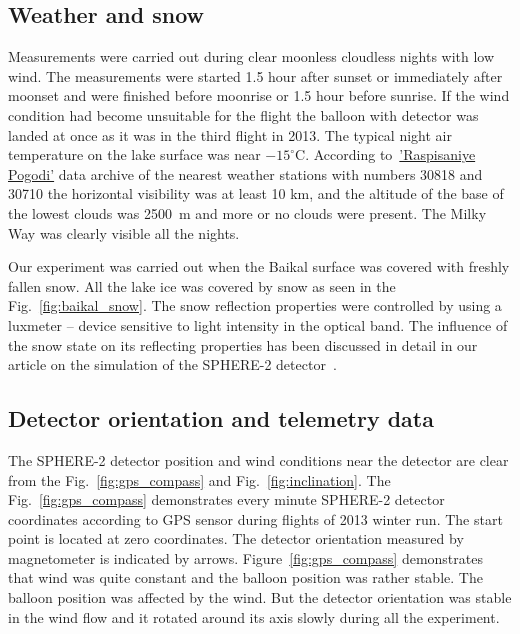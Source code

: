 \documentclass[final,5p,times,twocolumn]{elsarticle}
\begin{document}
\subsection{Weather and snow}

Measurements were carried out during clear moonless cloudless nights with low wind. The measurements were started 1.5 hour after sunset or immediately after moonset and were finished before moonrise or 1.5 hour before sunrise. If the wind condition had become unsuitable for the flight the balloon with detector was landed at once as it was in the third flight in 2013. The typical night air temperature on the lake surface was near $-15^\circ$C. According to~\href{https://rp5.ru/}{'Raspisaniye Pogodi'} data archive of the nearest weather stations with numbers 30818 and 30710 the horizontal visibility was at least 10 km, and the altitude of the base of the lowest clouds was 2500~m and more or no clouds were present. The Milky Way was clearly visible all the nights.

Our experiment was carried out when the Baikal surface was covered with freshly fallen snow. All the lake ice was covered by snow as seen in the Fig.~\ref{fig:baikal_snow}.  The snow reflection properties were controlled by using a luxmeter -- device sensitive to light intensity in the optical band. The influence of the snow state on its reflecting properties has been discussed in detail in our article on the simulation of the SPHERE-2 detector~\cite{Ant19}. 


\subsection{Detector orientation and telemetry data\label{sect:telemetrydata}}

The \mbox{SPHERE-2} detector position and wind conditions near the detector are clear from the Fig.~\ref{fig:gps_compass} and Fig.~\ref{fig:inclination}. The Fig.~\ref{fig:gps_compass} demonstrates every minute \mbox{SPHERE-2} detector coordinates according to GPS sensor during flights of 2013 winter run. The start point is located at zero coordinates. The detector orientation measured by magnetometer is indicated by arrows. Figure~\ref{fig:gps_compass} demonstrates that wind was quite constant and the balloon position was rather stable. The balloon position was affected by the wind. But the detector orientation was stable in the wind flow and it rotated around its axis slowly during all the experiment.  
\end{document}
